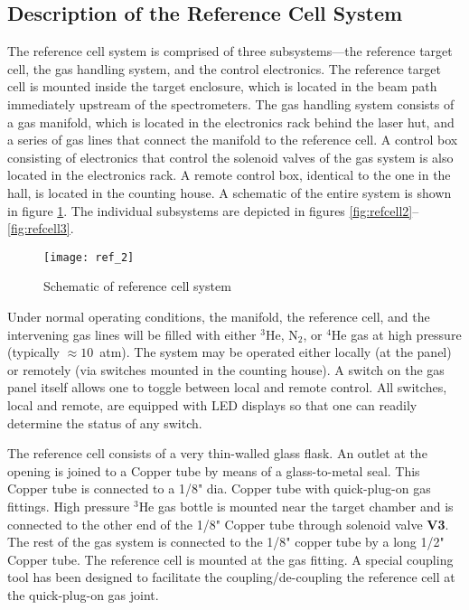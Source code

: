 \subsection{Description of the Reference Cell System}

The reference cell system is comprised of three
subsystems---the reference target cell, the gas handling system, and
the control electronics.  The reference target cell is mounted inside
the target enclosure, which is located in the beam path immediately
upstream of
the spectrometers.  The gas handling system consists of a gas
manifold, which is located in the electronics rack  behind the laser hut, and a series of gas
lines that connect the manifold to the reference cell. A control box consisting of electronics that control the solenoid valves of the gas system is also located in the electronics rack.  A remote control box, identical to the one in the hall, is located in the counting house.   A schematic of the
entire system is shown in figure \ref{fig:refcell1}.  The individual
subsystems are depicted in figures \ref{fig:refcell2}--\ref{fig:refcell3}.

\begin{figure}
\begin{center}
\centerline{ \texttt{[image: ref\_2]}}
\caption{Schematic of reference cell system}
\label{fig:refcell1}
\end{center}
\end{figure}

Under normal operating conditions, the manifold, the reference cell,
and the intervening gas lines will be filled with either $^3$He,
N$_2$, or $^{4}$He gas at high pressure 
(typically $\approx 10$~atm).  The system
may be operated either locally (at the panel) or remotely (via
switches mounted in the counting house).  A switch on the
gas panel itself allows one to toggle between local and remote
control.  All switches, local and remote, are equipped with LED
displays so that one can readily determine the status of any switch.

The reference cell consists of a very thin-walled glass flask.  An
outlet at the opening is joined to a Copper tube by means of a
glass-to-metal seal.  This Copper  tube is connected to a 1/8" dia.
Copper tube  with quick-plug-on gas fittings. High pressure $^3$He gas bottle is mounted   near the target chamber and is connected to the other end of the   1/8" Copper tube through solenoid valve {\bf V3}. The rest of the gas system is connected to the    1/8" copper tube   by a long 1/2" Copper tube. The reference cell is mounted at the gas fitting. A special coupling tool has been designed to facilitate the coupling/de-coupling the reference cell at the quick-plug-on gas joint.

